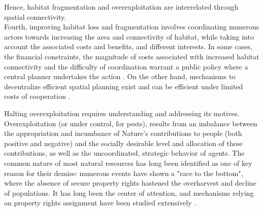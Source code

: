  Hence, habitat fragmentation and overexploitation are interrelated through spatial connectivity. 
\\
Fourth, improving habitat loss and fragmentation involves coordinating numerous actors towards increasing the area and connectivity of habitat, while taking into account the associated costs and benefits, and different interests.
 In some cases, the financial constraints, the magnitude of costs associated with increased habitat connectivity and the difficulty of coordination warrant a public policy where a central planner undertakes the action \citep{Mouysset2012}. On the other hand, mechanisms to decentralize efficient spatial planning exist and can be efficient under limited costs of cooperation \citep{costello_private_2017, bareille_agglomeration_2023}. 
 
	Halting overexploitation requires understanding and addressing its motives. Overexploitation (or under control, for pests), results from an imbalance between the appropriation and incumbance of Nature's contributions to people (both positive and negative) and the socially desirable level and allocation of these contributions, as well as the uncoordinated, strategic behavior of agents. 	
	The common nature of most natural resources \citep{Gordon1954, smith_models_1969} has long been identified as one of key reason for their demise: numerous events have shown a "race to the bottom", where the absence of secure property rights hastened the overharvest and decline of populations. It has long been the center of attention, and mechanisms relying on property rights assignment have been studied extensively \citep{libecap_tragedy_2009, costello_partial_2015, isaksen_tragedy_2019}.\\
	
